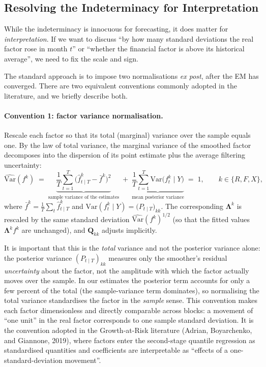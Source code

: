 \documentclass[11pt, a4paper, oneside]{article}
\newcommand{\mL}{\boldsymbol{\Lambda}}
\begin{document}
\subsection{Resolving the Indeterminacy for Interpretation}
\label{subsec:rot-resolving}

While the indeterminacy is innocuous for forecasting, it does matter
for \emph{interpretation}. If we want to discuss ``by how many
standard deviations the real factor rose in month $t$'' or ``whether
the financial factor is above its historical average'', we need to
fix the scale and sign.

The standard approach is to impose two normalisations \emph{ex post},
after the EM has converged. There are two equivalent conventions
commonly adopted in the literature, and we briefly describe both.

\paragraph{Convention 1: factor variance normalisation.}
Rescale each factor so that its total (marginal) variance over the
sample equals one. By the law of total variance, the marginal
variance of the smoothed factor decomposes into the dispersion of
its point estimate plus the average filtering uncertainty:
\[
\widehat{\mathrm{Var}}(f^k)
\;=\;
\underbrace{\frac{1}{T}\sum_{t=1}^{T}\big(\hat{f}^k_{t \mid T} - \bar{f}^k\big)^2}_{\text{sample variance of the estimates}}
\;+\;
\underbrace{\frac{1}{T}\sum_{t=1}^{T} \mathrm{Var}\!\big(f^k_t \mid Y\big)}_{\text{mean posterior variance}}
\;=\; 1,
\qquad k \in \{R, F, X\},
\]
where $\bar{f}^k = \tfrac{1}{T}\sum_t \hat{f}^k_{t \mid T}$ and
$\mathrm{Var}(f^k_t \mid Y) = \big(P_{t \mid T}\big)_{kk}$. The
corresponding $\mL^k$ is rescaled by the same standard deviation
$\widehat{\mathrm{Var}}(f^k)^{1/2}$ (so that the fitted values
$\mL^k f^k$ are unchanged), and $\mathbf{Q}_{kk}$ adjusts implicitly.

It is important that this is the \emph{total} variance and not the
posterior variance alone: the posterior variance
$(P_{t \mid T})_{kk}$ measures only the smoother's residual
\emph{uncertainty} about the factor, not the amplitude with which the
factor actually moves over the sample. In our estimates the
posterior term accounts for only a few percent of the total (the
sample-variance term dominates), so normalising the total variance
standardises the factor in the \emph{sample} sense. This convention
makes each factor dimensionless and directly comparable across
blocks: a movement of ``one unit'' in the real factor corresponds to
one sample standard deviation. It is the convention adopted in the
Growth-at-Risk literature (Adrian, Boyarchenko, and Giannone, 2019),
where factors enter the second-stage quantile regression as
standardised quantities and coefficients are interpretable as
``effects of a one-standard-deviation movement''.
\end{document}
